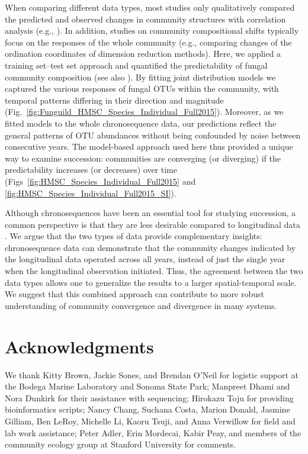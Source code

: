 When comparing different data types, most studies only qualitatively compared the predicted and observed changes in community structures with correlation analysis (e.g., \citealp{Foster2000, vanbreugel2006, Lebrijatrejos2010}). In addition, studies on community compositional shifts typically focus on the responses of the whole community (e.g., comparing changes of the ordination coordinates of dimension reduction methods).  
Here, we applied a training set--test set approach and quantified the predictability of fungal community composition (see also \citealp{Mora2015}). 
By fitting joint distribution models \citep{Ovaskainen2017} we captured the various responses of fungal OTUs within the community, with temporal patterns differing in their direction and magnitude (Fig.~\ref{fig:Funguild_HMSC_Species_Individual_Full2015}). 
Moreover, as we fitted models to the whole chronosequence data, our predictions reflect the general patterns of OTU abundances without being confounded by noise between consecutive years.
The model-based approach used here thus provided a unique way to examine succession: communities are converging (or diverging) if the predictability increases (or decreases) over time (Figs~\ref{fig:HMSC_Species_Individual_Full2015} and \ref{fig:HMSC_Species_Individual_Full2015_SI}).
\par


Although chronosequences have been an essential tool for studying succession, a common perspective is that they are less desirable compared to longitudinal data \citep{Johnson2008}. 
We argue that the two types of data provide complementary insights: chronosequence data can demonstrate that the community changes indicated by the longitudinal data operated across all years, instead of just the single year when the longitudinal observation initiated. Thus, the agreement between the two data types allows one to generalize the results to a larger spatial-temporal scale.
We suggest that this combined approach can contribute to more robust understanding of community convergence and divergence in many systems.
\bigskip



\section{Acknowledgments}
We thank Kitty Brown, Jackie Sones, and Brendan O'Neil for logistic support at the Bodega Marine Laboratory and Sonoma State Park; Manpreet Dhami and Nora Dunkirk for their assistance with sequencing; Hirokazu Toju for providing bioinformatics scripts; Nancy Chang, Suchana Costa, Marion Donald, Jasmine Gilliam, Ben LeRoy, Michelle Li, Kaoru Tsuji, and Anna Verwillow for field and lab work assistance; Peter Adler, Erin Mordecai, Kabir Peay, and members of the community ecology group at Stanford University for comments.



